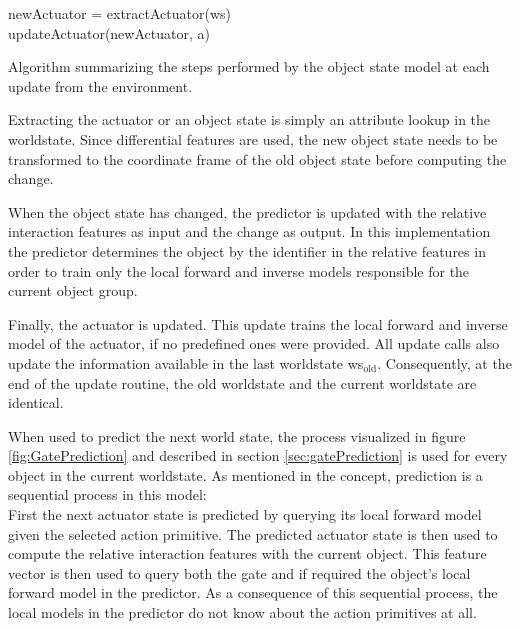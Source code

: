\begin{algorithm}
	\BlankLine
	newActuator = extractActuator(ws) \\
	updateActuator(newActuator, a) \\
	\BlankLine
\caption{Algorithm summarizing the steps performed by the object state model at each update from the environment.}
\label{alg:gateUpdate}
\end{algorithm}

Extracting the actuator or an object state is simply an attribute lookup in the worldstate. Since differential features are used, the new object state needs to be transformed to the coordinate frame of the old object state before computing the change.

When the object state has changed, the predictor is updated with the relative interaction features as input and the change as output. In this implementation the predictor determines the object by the identifier in the relative features in order to train only the local forward and inverse models responsible for the current object group.

Finally, the actuator is updated. This update trains the local forward and inverse model of the actuator, if no predefined ones were provided.
All update calls also update the information available in the last worldstate ws$_\text{old}$. Consequently, at the end of the update routine, the old worldstate and the current worldstate are identical.

When used to predict the next world state, the process visualized in figure \ref{fig:GatePrediction} and described in section \ref{sec:gatePrediction} is used for every object in the current worldstate. As mentioned in the concept, prediction is a sequential process in this model: \\
First the next actuator state is predicted by querying its local forward model given the selected action primitive. The predicted actuator state is then used to compute the relative interaction features with the current object. This feature vector is then used to query both the gate and if required the object's local forward model in the predictor. 
As a consequence of this sequential process, the local models in the predictor do not know about the action primitives at all. %

